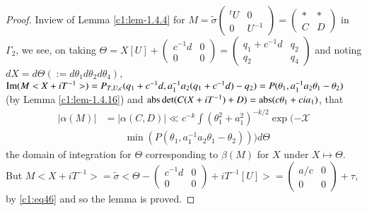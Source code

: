 \begin{proof}
In\pageoriginale view of Lemma \ref{c1:lem-1.4.4} for
$M=\tilde{\sigma}\left(\begin{smallmatrix} {}^{t}U & 0\\ 0 &
  U^{-1}
\end{smallmatrix}\right)=\left(\begin{smallmatrix} \ast & \ast \\ C &
  D
\end{smallmatrix}\right)$ in $\Gamma_{2}$, we see, on taking
$\Theta=X[U]+\left(\begin{smallmatrix} c^{-1}d & 0\\ 0 & 0
\end{smallmatrix}\right)=\left(\begin{smallmatrix} q_{1} +c^{-1}d &
  q_{2}\\ q_{2} & q_{4}\end{smallmatrix}\right)$ and noting
$dX=d\Theta(:=d\theta_{1}d\theta_{2}d\theta_{4})$,
$\operatorname{Im}(M<X+iT^{-1}>)=
P_{T,U,c}(q_{1}+c^{-1}d,a^{-1}_{1}a_{2}(q_{1}+c^{-1}d)-q_{2})=P(\theta_{1},a^{-1}_{1}a_{2}\theta_{1}-\theta_{2})$
(by Lemma \ref{c1:lem-1.4.16}) and $\operatorname{abs} \det (C(X+iT^{-1})+D)=\operatorname{abs}
(c\theta_{1}+cia_{1})$, that
\begin{align*}
|\alpha(M)|&=|\alpha(C,D)|\ll c^{-k}\int
(\theta^{2}_{1}+a^{2}_{1})^{-k/2}\exp(-\mathscr{X}\\
&\qquad\min(P(\theta_{1},a^{-1}_{1}a_{2}\theta_{1}-\theta_{2})))d\Theta
\end{align*}
the domain of integration for $\Theta$ corresponding to $\beta(M)$ for
$X$ under $X\mapsto \Theta$. But
$M<X+iT^{-1}>=\tilde{\sigma}<\Theta-\left(\begin{smallmatrix}
  c^{-1}d & 0\\ 0 &
  0\end{smallmatrix}\right)+iT^{-1}[U]>=\left(\begin{smallmatrix} a/c
    & 0\\ 0 & 0  \end{smallmatrix}\right)+\tau$, by \eqref{c1:eq46} and
  so the lemma is proved.
\end{proof}


